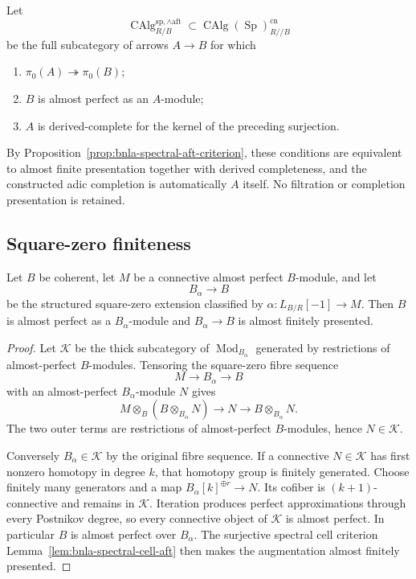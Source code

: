 \begin{definition}
\label{def:bnla-complete-aft-augmented}
Let
\[
    \operatorname{CAlg}^{\mathrm{sp},\wedge\mathrm{aft}}_{R/B}
    \subset
    \operatorname{CAlg}(\operatorname{Sp})^{\mathrm{cn}}_{R//B}
\]
be the full subcategory of arrows $A\to B$ for which
\begin{enumerate}
    \item $\pi_0(A)\twoheadrightarrow\pi_0(B)$;
    \item $B$ is almost perfect as an $A$-module;
    \item $A$ is derived-complete for the kernel of the preceding surjection.
\end{enumerate}
By Proposition~\ref{prop:bnla-spectral-aft-criterion}, these conditions are
equivalent to almost finite presentation together with derived completeness,
and the constructed adic completion is automatically $A$ itself.  No
filtration or completion presentation is retained.
\end{definition}

\subsection{Square-zero finiteness}

\begin{lemma}
\label{lem:bnla-spectral-square-zero-finiteness}
Let $B$ be coherent, let $M$ be a connective almost perfect $B$-module, and
let
\[
    B_\alpha\longrightarrow B
\]
be the structured square-zero extension classified by
$\alpha:L_{B/R}[-1]\to M$.  Then $B$ is almost perfect as a
$B_\alpha$-module and $B_\alpha\to B$ is almost finitely presented.
\end{lemma}

\begin{proof}
Let $\mathcal K$ be the thick subcategory of
$\operatorname{Mod}_{B_\alpha}$ generated by restrictions of almost-perfect
$B$-modules.  Tensoring the square-zero fibre sequence
\[
    M\longrightarrow B_\alpha\longrightarrow B
\]
with an almost-perfect $B_\alpha$-module $N$ gives
\[
    M\otimes_B(B\otimes_{B_\alpha}N)
    \longrightarrow N
    \longrightarrow B\otimes_{B_\alpha}N.
\]
The two outer terms are restrictions of almost-perfect $B$-modules, hence
$N\in\mathcal K$.

Conversely $B_\alpha\in\mathcal K$ by the original fibre sequence.  If a
connective $N\in\mathcal K$ has first nonzero homotopy in degree $k$, that
homotopy group is finitely generated.  Choose finitely many generators and a
map $B_\alpha[k]^{\oplus r}\to N$.  Its cofiber is $(k+1)$-connective and
remains in $\mathcal K$.  Iteration produces perfect approximations through
every Postnikov degree, so every connective object of $\mathcal K$ is almost
perfect.  In particular $B$ is almost perfect over $B_\alpha$.  The
surjective spectral cell criterion
Lemma~\ref{lem:bnla-spectral-cell-aft} then makes the augmentation almost
finitely presented.
\end{proof}

